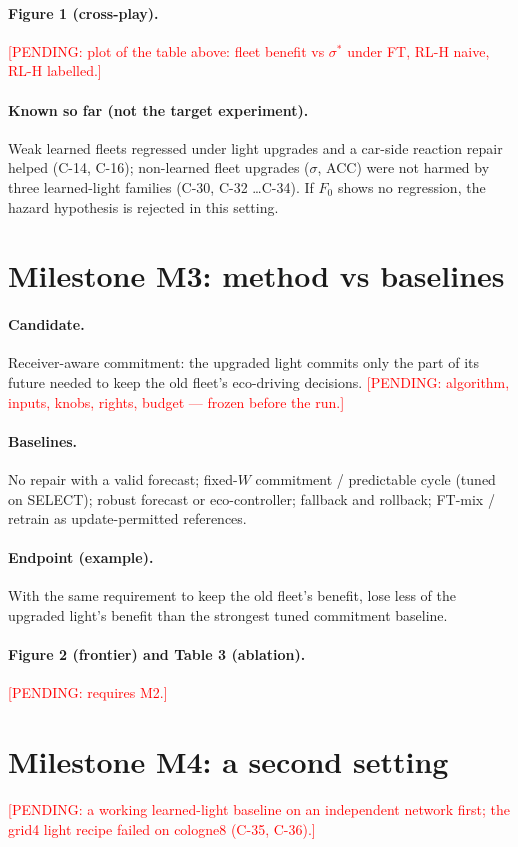 \documentclass[11pt]{article}
\newcommand{\pending}[1]{\textcolor{red}{[PENDING: #1]}}
\begin{document}
\paragraph{Figure 1 (cross-play).} \pending{plot of the table above: fleet benefit vs $\sigma^*$ under FT, RL-H naive, RL-H labelled.}
\paragraph{Known so far (not the target experiment).} Weak learned fleets regressed under light upgrades and a car-side reaction repair
helped (C-14, C-16); non-learned fleet upgrades ($\sigma$, ACC) were not harmed by three learned-light families (C-30, C-32 \dots C-34).
If $F_0$ shows no regression, the hazard hypothesis is rejected in this setting.

\section{Milestone M3: method vs baselines}
\paragraph{Candidate.} Receiver-aware commitment: the upgraded light commits only the part of its future needed to keep the old fleet's
eco-driving decisions. \pending{algorithm, inputs, knobs, rights, budget --- frozen before the run.}
\paragraph{Baselines.} No repair with a valid forecast; fixed-$W$ commitment / predictable cycle (tuned on SELECT); robust
forecast or eco-controller; fallback and rollback; FT-mix / retrain as update-permitted references.
\paragraph{Endpoint (example).} With the same requirement to keep the old fleet's benefit, lose less of the upgraded light's benefit
than the strongest tuned commitment baseline.
\paragraph{Figure 2 (frontier) and Table 3 (ablation).} \pending{requires M2.}

\section{Milestone M4: a second setting}
\pending{a working learned-light baseline on an independent network first; the grid4 light recipe failed on cologne8 (C-35, C-36).}
\end{document}
